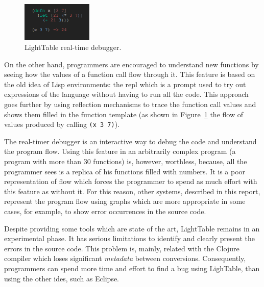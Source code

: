\begin{figure}
  \begin{center}
    \includegraphics[width=0.3\textwidth]{images/eval-close}
  \end{center}
 \caption{LightTable real-time debugger.}  
    \label{fig:lt2}
\end{figure}

On the other hand, programmers are encouraged to understand new functions by seeing how the values of a function call flow through it. This feature is based on the old idea of Lisp environments: the \gls{repl} which is a prompt used to try out expressions of the language without having to run all the code. This approach goes further by using reflection mechanisms to trace the function call values and shows them filled in the function template (as shown in Figure~\ref{fig:lt2} the flow of values produced by calling \texttt{(x 3 7)}).

The real-timer debugger is an interactive way to debug the code and understand the program flow. Using this feature in an arbitrarily complex program (a program with more than 30 functions) is, however, worthless, because, all the programmer sees is a replica of his functions filled with numbers. It is a poor representation of flow which forces the programmer to spend as much effort with this feature as without it. For this reason, other systems, described in this report, represent the program flow using graphs which are more appropriate in some cases, for example, to show error occurrences in the source code.

Despite providing some tools which are state of the art, LightTable remains in an experimental phase. It has serious limitations to identify and clearly present the errors in the source code. This problem is, mainly, related with the Clojure compiler which loses significant \textit{metadata} between conversions. Consequently, programmers can spend more time and effort to find a bug using LighTable, than using the other \glspl{ide}, such as Eclipse.
